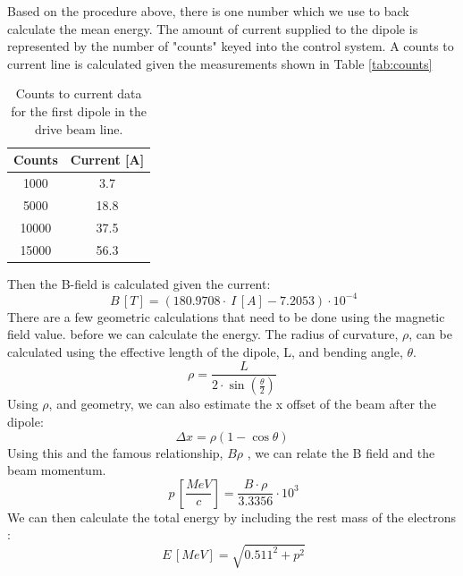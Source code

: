 \documentclass{iitthesis}
\begin{document}
Based on the procedure above, there is one number which we 
use to back calculate the mean energy. The amount of current
supplied to the dipole is represented by the number of "counts"
keyed into the control system. A counts to current line
is calculated given the measurements shown in Table \ref{tab:counts}
\begin{table}
\begin{center}
	\begin{tabular}{||c c||} 
		\hline
		Counts & Current [A] \\ [0.5ex] 
		\hline\hline
		1000 & 3.7 \\ 
		\hline
		5000 & 18.8 \\
		\hline
		10000 & 37.5 \\
		\hline
		15000 & 56.3 \\
		\hline
		
	\end{tabular}
\end{center}
\caption{Counts to current data for the first dipole in the drive beam line.}
\end{table}\label{tab:counts}
Then the B-field is calculated given the current: 
\begin{equation}
	\SI{}{B\,[T]} = (180.9708\cdot \SI{}{I\,[A]} - 7.2053)\cdot 10^{-4}
\end{equation}
There are a few geometric calculations that need to be done using the magnetic field value. 
before we can calculate the energy. 
The radius of curvature, $\rho$, 
can be calculated using the effective length of the dipole, L, and bending angle, $\theta$.
\begin{equation}
	\rho = \frac{L}{2\cdot \sin(\frac{\theta}{2})}
\end{equation}
Using $\rho$, and geometry, we can also estimate the x offset of the
beam after the dipole: 
\begin{equation}
	\Delta x = \rho \left( 1- \cos\theta \right)
\end{equation}
Using this and the famous relationship, $B\rho$ \cite{Wiedemann},
we can relate the B field and the beam momentum. 
\begin{equation}
	\SI{}{p\,\left[\frac{MeV}{c}\right]} = \frac{B\cdot \rho}{3.3356}\cdot 10^3
\end{equation}
We can then calculate the total energy by including the rest mass of the electrons \cite{Griffiths}:
\begin{equation}
	\SI{}{E\,[MeV]} = \sqrt{0.511^2+p^2}
\end{equation}\label{eq:energy}
\end{document}
